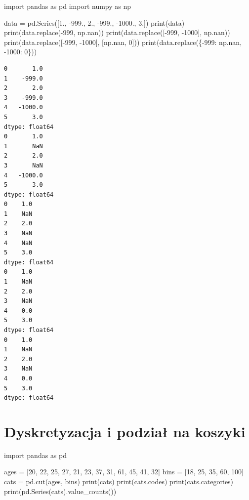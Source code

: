 \documentclass[
  polish,
  letterpaper,
  DIV=11,
  numbers=noendperiod]{scrreprt}
\newenvironment{Shaded}{\begin{snugshade}}{\end{snugshade}}
\newcommand{\BuiltInTok}[1]{\textcolor[rgb]{0.00,0.23,0.31}{#1}}
\newcommand{\DecValTok}[1]{\textcolor[rgb]{0.68,0.00,0.00}{#1}}
\newcommand{\FloatTok}[1]{\textcolor[rgb]{0.68,0.00,0.00}{#1}}
\newcommand{\ImportTok}[1]{\textcolor[rgb]{0.00,0.46,0.62}{#1}}
\newcommand{\NormalTok}[1]{\textcolor[rgb]{0.00,0.23,0.31}{#1}}
\newcommand{\OperatorTok}[1]{\textcolor[rgb]{0.37,0.37,0.37}{#1}}
\begin{document}
\begin{Shaded}
\begin{Highlighting}[]
\ImportTok{import}\NormalTok{ pandas }\ImportTok{as}\NormalTok{ pd}
\ImportTok{import}\NormalTok{ numpy }\ImportTok{as}\NormalTok{ np}

\NormalTok{data }\OperatorTok{=}\NormalTok{ pd.Series([}\FloatTok{1.}\NormalTok{, }\OperatorTok{{-}}\FloatTok{999.}\NormalTok{, }\FloatTok{2.}\NormalTok{, }\OperatorTok{{-}}\FloatTok{999.}\NormalTok{, }\OperatorTok{{-}}\FloatTok{1000.}\NormalTok{, }\FloatTok{3.}\NormalTok{])}
\BuiltInTok{print}\NormalTok{(data)}
\BuiltInTok{print}\NormalTok{(data.replace(}\OperatorTok{{-}}\DecValTok{999}\NormalTok{, np.nan))}
\BuiltInTok{print}\NormalTok{(data.replace([}\OperatorTok{{-}}\DecValTok{999}\NormalTok{, }\OperatorTok{{-}}\DecValTok{1000}\NormalTok{], np.nan))}
\BuiltInTok{print}\NormalTok{(data.replace([}\OperatorTok{{-}}\DecValTok{999}\NormalTok{, }\OperatorTok{{-}}\DecValTok{1000}\NormalTok{], [np.nan, }\DecValTok{0}\NormalTok{]))}
\BuiltInTok{print}\NormalTok{(data.replace(\{}\OperatorTok{{-}}\DecValTok{999}\NormalTok{: np.nan, }\OperatorTok{{-}}\DecValTok{1000}\NormalTok{: }\DecValTok{0}\NormalTok{\}))}
\end{Highlighting}
\end{Shaded}

\begin{verbatim}
0       1.0
1    -999.0
2       2.0
3    -999.0
4   -1000.0
5       3.0
dtype: float64
0       1.0
1       NaN
2       2.0
3       NaN
4   -1000.0
5       3.0
dtype: float64
0    1.0
1    NaN
2    2.0
3    NaN
4    NaN
5    3.0
dtype: float64
0    1.0
1    NaN
2    2.0
3    NaN
4    0.0
5    3.0
dtype: float64
0    1.0
1    NaN
2    2.0
3    NaN
4    0.0
5    3.0
dtype: float64
\end{verbatim}

\section{Dyskretyzacja i podział na
koszyki}\label{dyskretyzacja-i-podziaux142-na-koszyki}

\begin{Shaded}
\begin{Highlighting}[]
\ImportTok{import}\NormalTok{ pandas }\ImportTok{as}\NormalTok{ pd}

\NormalTok{ages }\OperatorTok{=}\NormalTok{ [}\DecValTok{20}\NormalTok{, }\DecValTok{22}\NormalTok{, }\DecValTok{25}\NormalTok{, }\DecValTok{27}\NormalTok{, }\DecValTok{21}\NormalTok{, }\DecValTok{23}\NormalTok{, }\DecValTok{37}\NormalTok{, }\DecValTok{31}\NormalTok{, }\DecValTok{61}\NormalTok{, }\DecValTok{45}\NormalTok{, }\DecValTok{41}\NormalTok{, }\DecValTok{32}\NormalTok{]}
\NormalTok{bins }\OperatorTok{=}\NormalTok{ [}\DecValTok{18}\NormalTok{, }\DecValTok{25}\NormalTok{, }\DecValTok{35}\NormalTok{, }\DecValTok{60}\NormalTok{, }\DecValTok{100}\NormalTok{]}
\NormalTok{cats }\OperatorTok{=}\NormalTok{ pd.cut(ages, bins)}
\BuiltInTok{print}\NormalTok{(cats)}
\BuiltInTok{print}\NormalTok{(cats.codes)}
\BuiltInTok{print}\NormalTok{(cats.categories)}
\BuiltInTok{print}\NormalTok{(pd.Series(cats).value\_counts())}
\end{Highlighting}
\end{Shaded}
\end{document}
